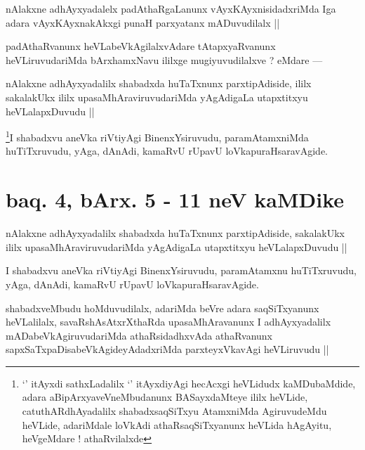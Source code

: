 \begin{artha}
nAlakxne adhAyxyadalelx padAthaRgaLanunx vAyxKAyxnisidadxriMda Iga adara vAyxKAyxnakAkxgi punaH parxyatanx mADuvudilalx ||
\end{artha}

\begin{artha}
padAthaRvanunx heVLabeVkAgilalxvAdare tAtapxyaRvanunx heVLiruvudariMda bArxhamxNavu ililxge mugiyuvudilalxve ? eMdare ---
\end{artha}

\begin{artha}
nAlakxne adhAyxyadalilx shabadxda huTaTxnunx parxtipAdiside, ililx sakalakUkx ililx upasaMhAraviruvudariMda yAgAdigaLa utapxtitxyu heVLalapxDuvudu ||
\end{artha}

\begin{artha}
\footnote{`\stext' itAyxdi sathxLadalilx `\stext' itAyxdiyAgi hecAcxgi heVLidudx kaMDubaMdide, adara aBipArxyaveVneMbudanunx BASayxdaMteye ililx heVLide, catuthARdhAyadalilx shabadxsaqSiTxyu AtamxniMda AgiruvudeMdu heVLide, adariMdale loVkAdi athaRsaqSiTxyanunx heVLida hAgAyitu, heVgeMdare ! athaRvilalxde}I shabadxvu aneVka riVtiyAgi BinenxYsiruvudu, paramAtamxniMda huTiTxruvudu, yAga, dAnAdi, kamaRvU rUpavU loVkapuraHsaravAgide.
\end{artha}

\section*{baq. 4, bArx. 5 - 11 neV kaMDike}

\begin{artha}
nAlakxne adhAyxyadalilx shabadxda huTaTxnunx parxtipAdiside, sakalakUkx ililx upasaMhAraviruvudariMda yAgAdigaLa utapxtitxyu heVLalapxDuvudu ||
\end{artha}

\begin{artha}
I shabadxvu aneVka riVtiyAgi BinenxYsiruvudu, paramAtamxnu huTiTxruvudu, yAga, dAnAdi, kamaRvU rUpavU loVkapuraHsaravAgide.
\end{artha}


\begin{artha}
shabadxveMbudu hoMduvudilalx, adariMda beVre adara saqSiTxyanunx heVLalilalx, savaRshAsAtxrXthaRda upasaMhAravanunx I adhAyxyadalilx mADabeVkAgiruvudariMda athaRsidadhxvAda athaRvanunx sapxSaTxpaDisabeVkAgideyAdadxriMda parxteyxVkavAgi heVLiruvudu ||
\end{artha}

